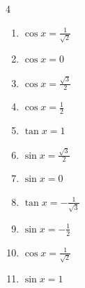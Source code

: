 \begin{multicols}{4}
\begin{enumerate}
  \item $\displaystyle \cos{x}  = \frac{1}{\sqrt{2}}$


  \item $\displaystyle \cos{x}  = 0$


  \item $\displaystyle \cos{x}  = \frac{\sqrt{3}}{2}$


  \item $\displaystyle \cos{x}  = \frac{1}{2}$


  \item $\displaystyle \tan{x}  = 1$


  \item $\displaystyle \sin{x}  = \frac{\sqrt{3}}{2}$


  \item $\displaystyle \sin{x}  = 0$

        \phantom{$\displaystyle x = 0 , \pi$}

\columnbreak %

  \item $\displaystyle \tan{x}  = -\frac{1}{\sqrt{3}}$


  \item $\displaystyle \sin{x}  = -\frac{1}{2}$


  \item $\displaystyle \cos{x}  = \frac{1}{\sqrt{2}}$


  \item $\displaystyle \sin{x}  = 1$



\end{enumerate}
\end{multicols}
